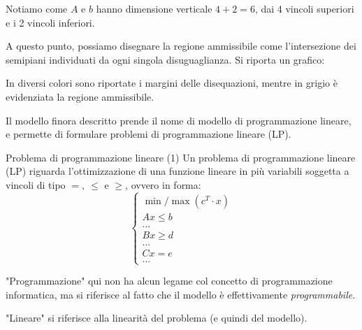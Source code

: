 \documentclass[a4paper,11pt]{article}
\begin{document}
Notiamo come $A$ e $b$ hanno dimensione verticale $ 4 + 2 = 6 $, dai 4 vincoli superiori e i 2 vincoli inferiori.

A questo punto, possiamo disegnare la regione ammissibile come l'intersezione dei semipiani individuati da ogni singola disuguaglianza.
Si riporta un grafico:


In diversi colori sono riportate i margini delle disequazioni, mentre in grigio è evidenziata la regione ammissibile.

\par\smallskip

Il modello finora descritto prende il nome di modello di programmazione lineare, e permette di formulare problemi di programmazione lineare (LP).

\begin{definition}{Problema di programmazione lineare (1)}
Un problema di programmazione lineare (LP) riguarda l'ottimizzazione di una funzione lineare in più variabili
soggetta a vincoli di tipo $ =, \ \leq $ e $ \geq $, ovvero in forma:
\[
	\begin{cases}
			\min / \max(c^T \cdot x) \\
			A x \leq b \\
			... \\
			B x \geq d \\
			... \\
			C x = e \\
			...
	\end{cases}
\]
\end{definition}

"Programmazione" qui non ha alcun legame col concetto di programmazione informatica, ma si riferisce al fatto che il modello è effettivamente \textit{programmabile}.

"Lineare" si riferisce alla linearità del problema (e quindi del modello).
\end{document}
